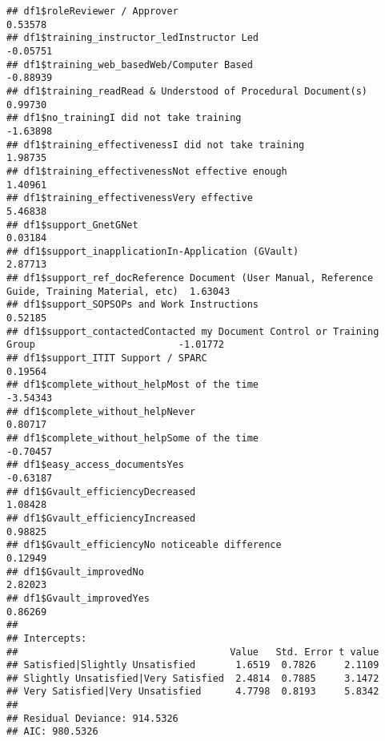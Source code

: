 \documentclass[
]{article}
\begin{document}
\begin{verbatim}
## df1$roleReviewer / Approver                                                                   0.53578
## df1$training_instructor_ledInstructor Led                                                    -0.05751
## df1$training_web_basedWeb/Computer Based                                                     -0.88939
## df1$training_readRead & Understood of Procedural Document(s)                                  0.99730
## df1$no_trainingI did not take training                                                       -1.63898
## df1$training_effectivenessI did not take training                                             1.98735
## df1$training_effectivenessNot effective enough                                                1.40961
## df1$training_effectivenessVery effective                                                      5.46838
## df1$support_GnetGNet                                                                          0.03184
## df1$support_inapplicationIn-Application (GVault)                                              2.87713
## df1$support_ref_docReference Document (User Manual, Reference Guide, Training Material, etc)  1.63043
## df1$support_SOPSOPs and Work Instructions                                                     0.52185
## df1$support_contactedContacted my Document Control or Training Group                         -1.01772
## df1$support_ITIT Support / SPARC                                                              0.19564
## df1$complete_without_helpMost of the time                                                    -3.54343
## df1$complete_without_helpNever                                                                0.80717
## df1$complete_without_helpSome of the time                                                    -0.70457
## df1$easy_access_documentsYes                                                                 -0.63187
## df1$Gvault_efficiencyDecreased                                                                1.08428
## df1$Gvault_efficiencyIncreased                                                                0.98825
## df1$Gvault_efficiencyNo noticeable difference                                                 0.12949
## df1$Gvault_improvedNo                                                                         2.82023
## df1$Gvault_improvedYes                                                                        0.86269
## 
## Intercepts:
##                                     Value   Std. Error t value
## Satisfied|Slightly Unsatisfied       1.6519  0.7826     2.1109
## Slightly Unsatisfied|Very Satisfied  2.4814  0.7885     3.1472
## Very Satisfied|Very Unsatisfied      4.7798  0.8193     5.8342
## 
## Residual Deviance: 914.5326 
## AIC: 980.5326
\end{verbatim}
\end{document}
